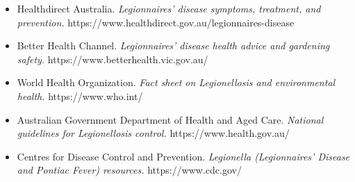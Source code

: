 \begin{itemize}
    \item Healthdirect Australia. \textit{Legionnaires' disease symptoms, treatment, and prevention.} https://www.healthdirect.gov.au/legionnaires-disease
    \item Better Health Channel. \textit{Legionnaires' disease health advice and gardening safety.} https://www.betterhealth.vic.gov.au/
    \item World Health Organization. \textit{Fact sheet on Legionellosis and environmental health.} https://www.who.int/
    \item Australian Government Department of Health and Aged Care. \textit{National guidelines for Legionellosis control.} https://www.health.gov.au/
    \item Centres for Disease Control and Prevention. \textit{Legionella (Legionnaires' Disease and Pontiac Fever) resources.} https://www.cdc.gov/
\end{itemize}
